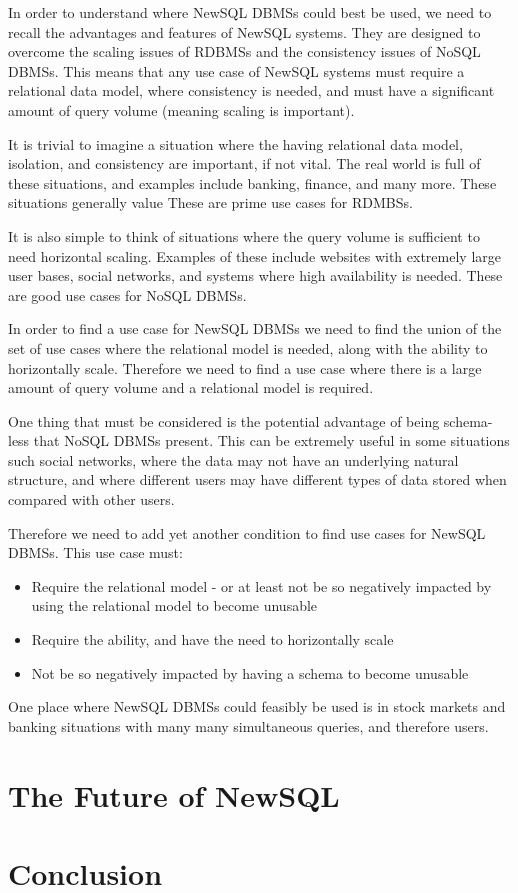 \documentclass[10pt, conference]{IEEEtran}
\begin{document}
In order to understand where NewSQL DBMSs could best be used, we need to recall the advantages and features of NewSQL systems. They are designed to overcome the scaling issues of RDBMSs and the consistency issues of NoSQL DBMSs. This means that any use case of NewSQL systems must require a relational data model, where consistency is needed, and must have a significant amount of query volume (meaning scaling is important).

It is trivial to imagine a situation where the having relational data model, isolation, and consistency are important, if not vital. The real world is full of these situations, and examples include banking, finance, and many more. These situations generally value  These are prime use cases for RDMBSs.

It is also simple to think of situations where the query volume is sufficient to need horizontal scaling. Examples of these include websites with extremely large user bases, social networks, and systems where high availability is needed. These are good use cases for NoSQL DBMSs.

In order to find a use case for NewSQL DBMSs we need to find the union of the set of use cases where the relational model is needed, along with the ability to horizontally scale. Therefore we need to find a use case where there is a large amount of query volume and a relational model is required.

One thing that must be considered is the potential advantage of being schema-less that NoSQL DBMSs present. This can be extremely useful in some situations such social networks, where the data may not have an underlying natural structure, and where different users may have different types of data stored when compared with other users. 

Therefore we need to add yet another condition to find use cases for NewSQL DBMSs. This use case must:
\begin{itemize}
	\item{Require the relational model - or at least not be so negatively impacted by using the relational model to become unusable}
	\item{Require the ability, and have the need to horizontally scale}
	\item{Not be so negatively impacted by having a schema to become unusable}
\end{itemize}

One place where NewSQL DBMSs could feasibly be used is in stock markets and banking situations with many many simultaneous queries, and therefore users.

\section{The Future of NewSQL}

\section{Conclusion}




\end{document}
